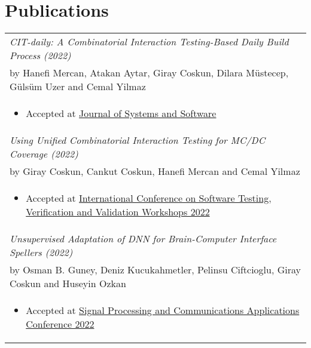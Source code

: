 \documentclass[a4paper,10pt]{article} %
\begin{document}


\section{Publications}

\begin{longtable}{p{12cm}}

\emph{CIT-daily: A Combinatorial Interaction Testing-Based Daily Build Process (2022)} \\by \footnotesize{Hanefi Mercan, Atakan Aytar, Giray Coskun, Dilara Müstecep, Gülsüm Uzer and Cemal Yilmaz} \\ \begin{itemize} \item \footnotesize{Accepted at \href{https://www.journals.elsevier.com/journal-of-systems-and-software}{Journal of Systems and Software}} \end{itemize}\\

\emph{Using Unified Combinatorial Interaction Testing for MC/DC Coverage (2022)} \\by \footnotesize{Giray Coskun, Cankut Coskun, Hanefi Mercan and Cemal Yilmaz} \\ \begin{itemize} \item \footnotesize{Accepted at \href{https://icst2022.vrain.upv.es/home/iwct-2022}{International Conference on Software Testing, Verification and Validation Workshops 2022}} \end{itemize}\\

\emph{Unsupervised Adaptation of DNN for Brain-Computer Interface Spellers (2022)} \\by \footnotesize{Osman B. Guney, Deniz Kucukahmetler, Pelinsu Ciftcioglu, Giray Coskun and Huseyin Ozkan} \\ \begin{itemize} \item \footnotesize{Accepted at \href{https://siu2022.bau.edu.tr/tr/}{Signal Processing and Communications Applications Conference 2022}} \end{itemize}\\

\end{longtable}
\end{document}
